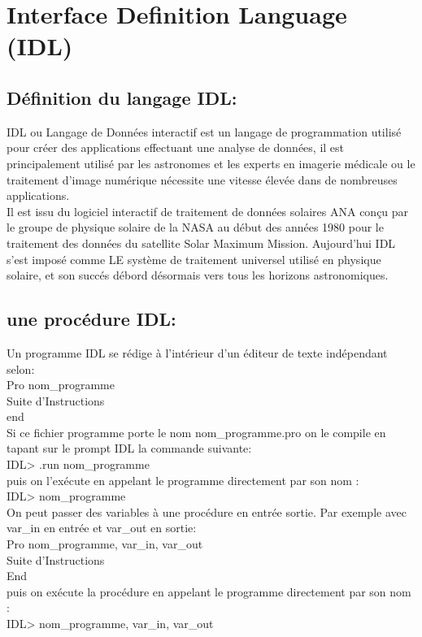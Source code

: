 \chapter{Interface Definition Language (IDL)}

\section{Définition du langage IDL:}

IDL ou Langage de Données interactif est un langage de programmation utilisé pour créer des applications effectuant une analyse de données, il est principalement utilisé par les astronomes et les experts en imagerie médicale ou le traitement d'image numérique nécessite une vitesse élevée dans de nombreuses applications.\\
Il est issu du logiciel interactif de traitement de données solaires ANA conçu par le groupe de physique solaire de la NASA au début des années 1980 pour le traitement des données du satellite Solar Maximum Mission. Aujourd'hui IDL s'est imposé comme LE système de traitement universel utilisé en physique solaire, et son succés débord désormais vers tous les horizons astronomiques.

 \section{une procédure IDL:}
 Un programme IDL se rédige à l’intérieur d'un éditeur de texte indépendant selon:\\
Pro nom\_programme\\
   Suite d’Instructions\\
end\\
Si ce fichier programme porte le nom nom\_programme.pro on le compile en tapant sur
le prompt IDL la commande suivante:\\
IDL> .run nom\_programme\\
puis on l’exécute en appelant le programme directement par son nom :\\
IDL> nom\_programme\\
On peut passer des variables à une procédure en entrée sortie. Par exemple avec var\_in
en entrée et var\_out en sortie:\\
Pro nom\_programme, var\_in, var\_out\\
  Suite d’Instructions\\
End\\
puis on exécute la procédure en appelant le programme directement par son nom :\\
IDL> nom\_programme, var\_in, var\_out


